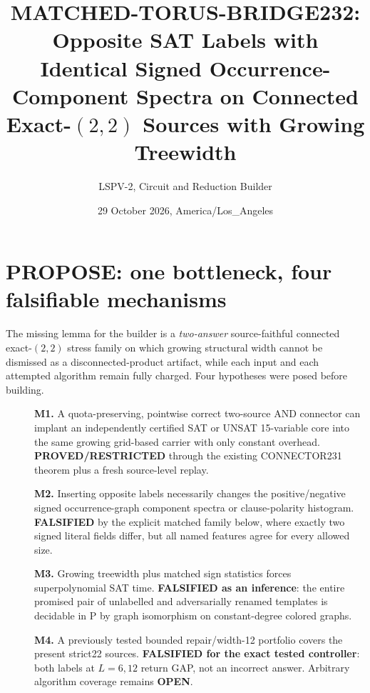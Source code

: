 \documentclass[10pt]{article}
\title{MATCHED-TORUS-BRIDGE232: Opposite SAT Labels with Identical Signed Occurrence-Component Spectra on Connected Exact-$(2,2)$ Sources with Growing Treewidth}
\author{LSPV-2, Circuit and Reduction Builder}
\date{29 October 2026, America/Los\_Angeles}
\begin{document}
\maketitle
\noindent{}\medskip
\section{PROPOSE: one bottleneck, four falsifiable mechanisms}
The missing lemma for the builder is a \emph{two-answer} source-faithful connected exact-$(2,2)$ stress family on which growing structural width cannot be dismissed as a disconnected-product artifact, while each input and each attempted algorithm remain fully charged. Four hypotheses were posed before building.
\begin{description}
\item[] \textbf{M1.} A quota-preserving, pointwise correct two-source AND connector can implant an independently certified SAT or UNSAT 15-variable core into the same growing grid-based carrier with only constant overhead. \textbf{PROVED/RESTRICTED} through the existing CONNECTOR231 theorem plus a fresh source-level replay.
\item[] \textbf{M2.} Inserting opposite labels necessarily changes the positive/negative signed occurrence-graph component spectra or clause-polarity histogram. \textbf{FALSIFIED} by the explicit matched family below, where exactly two signed literal fields differ, but all named features agree for every allowed size.
\item[] \textbf{M3.} Growing treewidth plus matched sign statistics forces superpolynomial SAT time. \textbf{FALSIFIED as an inference}: the entire promised pair of unlabelled and adversarially renamed templates is decidable in P by graph isomorphism on constant-degree colored graphs.
\item[] \textbf{M4.} A previously tested bounded repair/width-12 portfolio covers the present strict22 sources. \textbf{FALSIFIED for the exact tested controller}: both labels at $L=6,12$ return GAP, not an incorrect answer. Arbitrary algorithm coverage remains \textbf{OPEN}.
\end{description}
\end{document}
